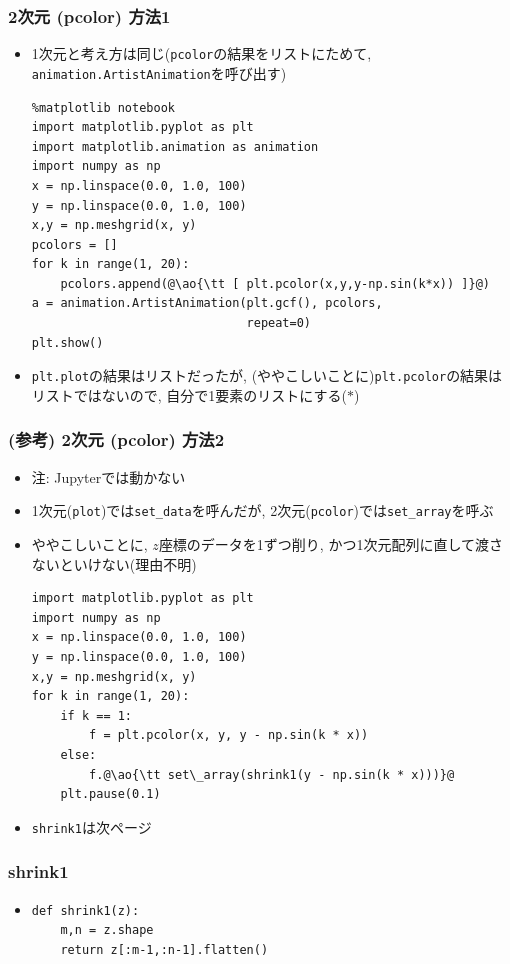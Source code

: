 \documentclass[10pt,dvipdfmx]{beamer}
\newcommand{\ao}[1]{{\color{blue}#1}}
\begin{document}
\begin{frame}[fragile]
  \frametitle{2次元 (pcolor) 方法1}
  \begin{itemize}
  \item 1次元と考え方は同じ({\tt pcolor}の結果をリストにためて,
    {\tt animation.ArtistAnimation}を呼び出す)
\begin{center}
\begin{lstlisting}
%matplotlib notebook
import matplotlib.pyplot as plt
import matplotlib.animation as animation
import numpy as np
x = np.linspace(0.0, 1.0, 100)
y = np.linspace(0.0, 1.0, 100)
x,y = np.meshgrid(x, y)
pcolors = []
for k in range(1, 20):
    pcolors.append(@\ao{\tt [ plt.pcolor(x,y,y-np.sin(k*x)) ]}@)
a = animation.ArtistAnimation(plt.gcf(), pcolors,
                              repeat=0)
plt.show()
\end{lstlisting}
\end{center}
\item {\tt plt.plot}の結果はリストだったが,
  (ややこしいことに){\tt plt.pcolor}の結果はリストではないので,
  自分で1要素のリストにする($\ast$)
\end{itemize}
\end{frame}

\begin{frame}[fragile]
  \frametitle{(参考) 2次元 (pcolor) 方法2}
  \begin{itemize}
  \item 注: Jupyterでは動かない
  \item 1次元({\tt plot})では{\tt set\_data}を呼んだが,
    2次元({\tt pcolor})では{\tt set\_array}を呼ぶ
  \item ややこしいことに, $z$座標のデータを1ずつ削り,
    かつ1次元配列に直して渡さないといけない(理由不明)
\begin{lstlisting}
import matplotlib.pyplot as plt
import numpy as np
x = np.linspace(0.0, 1.0, 100)
y = np.linspace(0.0, 1.0, 100)
x,y = np.meshgrid(x, y)
for k in range(1, 20):
    if k == 1:
        f = plt.pcolor(x, y, y - np.sin(k * x))
    else:
        f.@\ao{\tt set\_array(shrink1(y - np.sin(k * x)))}@
    plt.pause(0.1)
\end{lstlisting}
\item {\tt shrink1}は次ページ
  \end{itemize}
\end{frame}

\begin{frame}[fragile]
  \frametitle{shrink1}
  \begin{itemize}
  \item []
\begin{lstlisting}
def shrink1(z):
    m,n = z.shape
    return z[:m-1,:n-1].flatten()
\end{lstlisting}
\end{itemize}
\end{frame}
\end{document}
